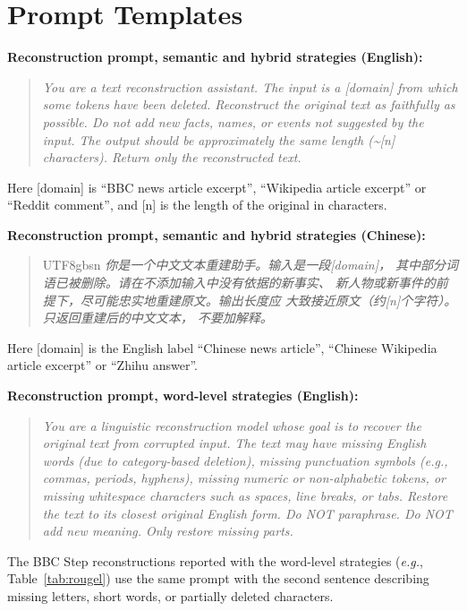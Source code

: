 \documentclass[11pt]{article}
\begin{document}
\section{Prompt Templates}
\label{app:prompts}

\textbf{Reconstruction prompt, semantic and hybrid strategies (English):}

\begin{quote}
\textit{You are a text reconstruction assistant. The input
is a \textup{[domain]} from which some tokens have been deleted.
Reconstruct the original text as faithfully as possible.
Do not add new facts, names, or events not suggested by the
input. The output should be approximately the same length
(\textasciitilde\textup{[n]} characters). Return only the
reconstructed text.}
\end{quote}
\noindent Here \textup{[domain]} is ``BBC news article excerpt'', ``Wikipedia article excerpt'' or
``Reddit comment'', and \textup{[n]} is the length of the original in characters.

\textbf{Reconstruction prompt, semantic and hybrid strategies (Chinese):}
\begin{quote}
\begin{CJK*}{UTF8}{gbsn}
\textit{你是一个中文文本重建助手。输入是一段\textup{[domain]}，
其中部分词语已被删除。请在不添加输入中没有依据的新事实、
新人物或新事件的前提下，尽可能忠实地重建原文。输出长度应
大致接近原文（约\textup{[n]}个字符）。只返回重建后的中文文本，
不要加解释。}
\end{CJK*}
\end{quote}
\noindent Here \textup{[domain]} is the English label ``Chinese news article'', ``Chinese Wikipedia article excerpt''
or ``Zhihu answer''.

\textbf{Reconstruction prompt, word-level strategies (English):}
\begin{quote}
\textit{You are a linguistic reconstruction model whose goal is to recover the original text from corrupted
input. The text may have missing English words (due to category-based deletion), missing punctuation
symbols ({\em e.g.}, commas, periods, hyphens), missing numeric or non-alphabetic tokens, or missing whitespace
characters such as spaces, line breaks, or tabs. Restore the text to its closest original English form. Do
NOT paraphrase. Do NOT add new meaning. Only restore missing parts.}
\end{quote}
The BBC Step reconstructions reported with the word-level strategies ({\em e.g.}, Table~\ref{tab:rougel}) use the
same prompt with the second sentence describing missing letters, short words, or partially deleted characters.
\end{document}
